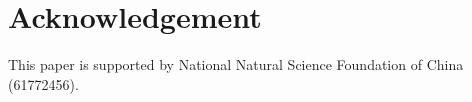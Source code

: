\documentclass[5p]{elsarticle}
\begin{document}
\begin{CJK}{UTF8}{gbsn}
\begin{frontmatter}
\end{frontmatter}

\linenumbers








\section*{Acknowledgement}
This paper is supported by National Natural Science Foundation of China (61772456).






\end{CJK}
\end{document}

